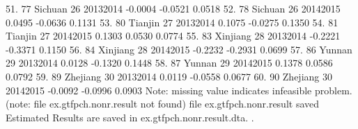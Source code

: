  51. {\VBAR}  77        Sichuan   26   2013{\tytilde}2014   -0.0004   -0.0521   0.0518 {\VBAR}
 52. {\VBAR}  78        Sichuan   26   2014{\tytilde}2015    0.0495   -0.0636   0.1131 {\VBAR}
 53. {\VBAR}  80        Tianjin   27   2013{\tytilde}2014    0.1075   -0.0275   0.1350 {\VBAR}
 54. {\VBAR}  81        Tianjin   27   2014{\tytilde}2015    0.1303    0.0530   0.0774 {\VBAR}
 55. {\VBAR}  83       Xinjiang   28   2013{\tytilde}2014   -0.2221   -0.3371   0.1150 {\VBAR}
 56. {\VBAR}  84       Xinjiang   28   2014{\tytilde}2015   -0.2232   -0.2931   0.0699 {\VBAR}
 57. {\VBAR}  86         Yunnan   29   2013{\tytilde}2014    0.0128   -0.1320   0.1448 {\VBAR}
 58. {\VBAR}  87         Yunnan   29   2014{\tytilde}2015    0.1378    0.0586   0.0792 {\VBAR}
 59. {\VBAR}  89       Zhejiang   30   2013{\tytilde}2014    0.0119   -0.0558   0.0677 {\VBAR}
 60. {\VBAR}  90       Zhejiang   30   2014{\tytilde}2015   -0.0092   -0.0996   0.0903 {\VBAR}
     {\BLC}
Note: missing value indicates infeasible problem.
(note: file ex.gtfpch.nonr.result not found)
file ex.gtfpch.nonr.result saved
{\smallskip}
Estimated Results are saved in ex.gtfpch.nonr.result.dta.
{\smallskip}
. 
